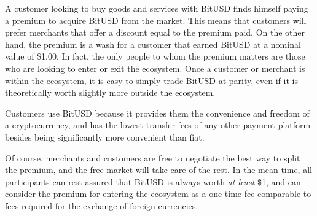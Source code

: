 A customer looking to buy goods and services with BitUSD finds himself paying a
premium to acquire BitUSD from the market. This means that customers will
prefer merchants that offer a discount equal to the premium paid. On the other
hand, the premium is a wash for a customer that earned BitUSD at a nominal
value of \$1.00. In fact, the only people to whom the premium matters are those
who are looking to enter or exit the ecosystem. Once a customer or merchant is
within the ecosystem, it is easy to simply trade BitUSD at parity, even if it
is theoretically worth slightly more outside the ecosystem.

Customers use BitUSD because it provides them the convenience and freedom of a
cryptocurrency, and has the lowest transfer fees of any other payment platform
besides being significantly more convenient than fiat.

Of course, merchants and customers are free to negotiate the best way to split
the premium, and the free market will take care of the rest. In the mean time,
all participants can rest assured that BitUSD is always worth \emph{at least}
\$1, and can consider the premium for entering the ecosystem as a one-time fee
comparable to fees required for the exchange of foreign currencies.
